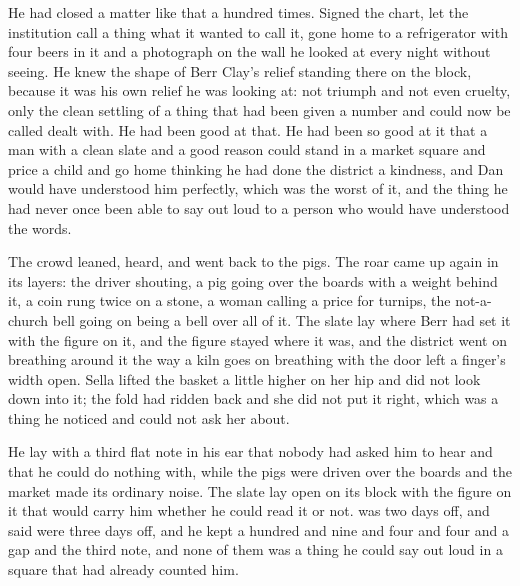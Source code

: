 He had closed a matter like that a hundred times. Signed the chart, let the institution call a thing what it wanted to call it, gone home to a refrigerator with four beers in it and a photograph on the wall he looked at every night without seeing. He knew the shape of Berr Clay's relief standing there on the block, because it was his own relief he was looking at: not triumph and not even cruelty, only the clean settling of a thing that had been given a number and could now be called dealt with. He had been good at that. He had been so good at it that a man with a clean slate and a good reason could stand in a market square and price a child and go home thinking he had done the district a kindness, and Dan would have understood him perfectly, which was the worst of it, and the thing he had never once been able to say out loud to a person who would have understood the words.

The crowd leaned, heard, and went back to the pigs. The roar came up again in its layers: the driver shouting, a pig going over the boards with a weight behind it, a coin rung twice on a stone, a woman calling a price for turnips, the not-a-church bell going on being a bell over all of it. The slate lay where Berr had set it with the figure on it, and the figure stayed where it was, and the district went on breathing around it the way a kiln goes on breathing with the door left a finger's width open. Sella lifted the basket a little higher on her hip and did not look down into it; the fold had ridden back and she did not put it right, which was a thing he noticed and could not ask her about.

He lay with a third flat note in his ear that nobody had asked him to hear and that he could do nothing with, while the pigs were driven over the boards and the market made its ordinary noise. The slate lay open on its block with the figure on it that would carry him whether he could read it or not.  was two days off, and  said  were three days off, and he kept a hundred and nine and four and four and a gap and the third note, and none of them was a thing he could say out loud in a square that had already counted him.

